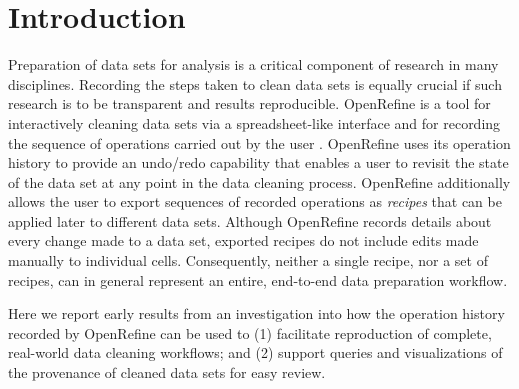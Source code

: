 \section{Introduction}

Preparation of data sets for analysis is a critical component of research in many disciplines. Recording the steps taken to clean data sets is equally crucial if such research is to be transparent and results reproducible. OpenRefine is a tool for interactively cleaning data sets via a spreadsheet-like interface and for recording the sequence of operations carried out by the user \cite{verborgh_using_2013}. OpenRefine uses its operation history to provide an undo/redo capability that enables a user to revisit the state of the data set at any point in the data cleaning process. OpenRefine additionally allows the user to export sequences of recorded operations as \emph{recipes} that can be applied later to different data sets. Although OpenRefine records details about every change made to a data set, exported recipes do not include edits made manually to individual cells. Consequently, neither a single recipe, nor a set of recipes, can in general represent an entire, end-to-end data preparation workflow. 

Here we report early results from an investigation into how the operation history recorded by OpenRefine can be used to (1) facilitate reproduction of complete, real-world data cleaning workflows; and (2) support queries and visualizations of the provenance of cleaned data sets for easy review.
